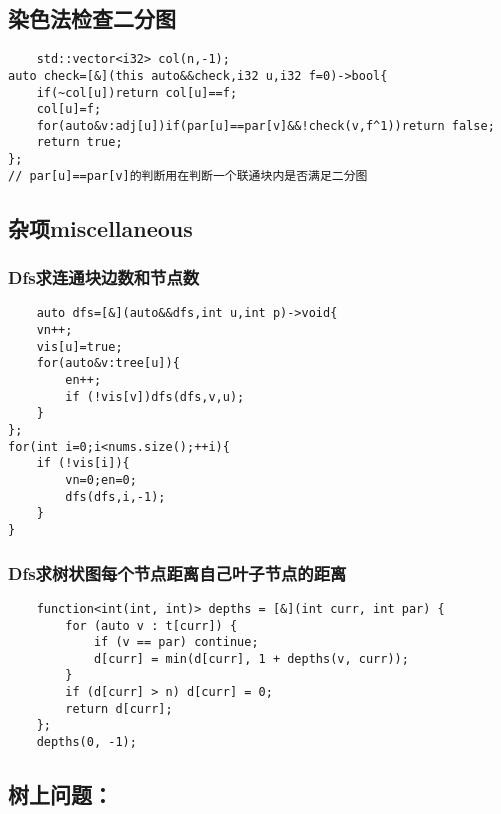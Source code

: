 \documentclass[UTF8]{ctexart}
\begin{document}
\subsection{染色法检查二分图}
\begin{lstlisting}
    std::vector<i32> col(n,-1);
auto check=[&](this auto&&check,i32 u,i32 f=0)->bool{
    if(~col[u])return col[u]==f;
    col[u]=f;
    for(auto&v:adj[u])if(par[u]==par[v]&&!check(v,f^1))return false;
    return true;
};
// par[u]==par[v]的判断用在判断一个联通块内是否满足二分图
\end{lstlisting}
\subsection{杂项miscellaneous}
\subsubsection{Dfs求连通块边数和节点数}
\begin{lstlisting}
    auto dfs=[&](auto&&dfs,int u,int p)->void{
    vn++;
    vis[u]=true;
    for(auto&v:tree[u]){
        en++;
        if (!vis[v])dfs(dfs,v,u);
    }
};
for(int i=0;i<nums.size();++i){
    if (!vis[i]){
        vn=0;en=0;
        dfs(dfs,i,-1);
    }
}
\end{lstlisting}
\subsubsection{Dfs求树状图每个节点距离自己叶子节点的距离}
\begin{lstlisting}
    function<int(int, int)> depths = [&](int curr, int par) {
		for (auto v : t[curr]) {
			if (v == par) continue;
			d[curr] = min(d[curr], 1 + depths(v, curr));
		}
		if (d[curr] > n) d[curr] = 0;
		return d[curr];
	};
	depths(0, -1);
\end{lstlisting}
\subsection{树上问题：}
\end{document}
